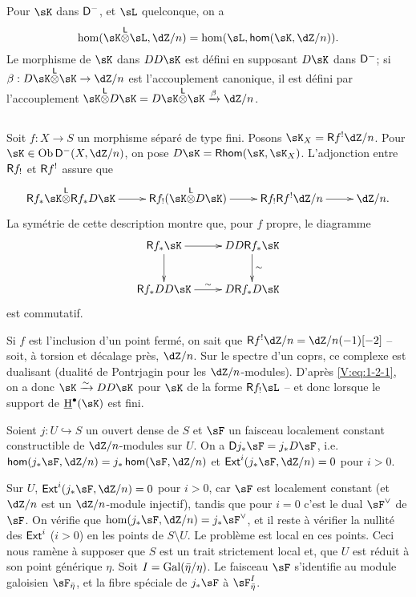 Pour $\sK$ dans $\mathsf{D}^-$, et $\sL$ quelconque, on a 
\[
  \hom(\sK\lotimes \sL,\dZ/n) = \hom(\sL,\Hom(\sK,\dZ/n)) \text{.}
\]
Le morphisme de $\sK$ dans $DD\sK$ est d\'efini en supposant $D\sK$ dans 
$\mathsf{D}^-$; si $\beta:D\sK\lotimes\sK\to \dZ/n$ est l'accouplement canonique, il 
est d\'efini par l'accouplement 
$\sK\lotimes D\sK=D\sK\lotimes \sK \xrightarrow\beta \dZ/n$. 





\subsection{}\label{V:1-2}

Soit $f:X\to S$ un morphisme s\'epar\'e de type fini. Posons 
$\sK_X=\R f^!\dZ/n$. Pour $\sK\in \ob\D^-(X,\dZ/n)$, on pose 
$D\sK = \rHom(\sK,\sK_X)$. L'adjonction entre $\mathsf{R} f_!$ et $\mathsf{R} f^!$ 
assure que 
\[\xymatrix{
  \R f_\ast \sK\lotimes \R f_\ast D\sK \ar[r] 
    & \R f_! (\sK\lotimes D\sK) \ar[r] 
    & \R f_! \R f^! \dZ/n \ar[r] 
    & \dZ/n \text{.}
}\]
La sym\'etrie de cette description montre que, pour $f$ propre, le diagramme 
\begin{equation}\label{V:eq:1-2-1}
\xymatrix{
  \R f_\ast \sK \ar[r] \ar[d] 
    & D D \R f_\ast \sK \ar[d]^-\sim \\
  \R f_\ast D D \sK \ar[r]^\sim 
    & D\R f_\ast D\sK
}
\end{equation}
est commutatif. 

Si $f$ est l'inclusion d'un point ferm\'e, on sait que 
$\R f^!\dZ/n=\dZ/n(-1)[-2]$ -- soit, \`a torsion et d\'ecalage pr\`es, $\dZ/n$. 
Sur le spectre d'un coprs, ce complexe est dualisant (dualit\'e de Pontrjagin 
pour les $\dZ/n$-modules). D'apr\`es \eqref{V:eq:1-2-1}, on a donc 
$\sK\iso D D\sK$ pour $\sK$ de la forme $\R f_!\sL$ -- et donc lorsque le 
support de $\underline\h^\bullet(\sK)$ est fini. 





\begin{theorem_}\label{V:1-3}
Soient $j:U\hookrightarrow S$ un ouvert dense de $S$ et $\sF$ un faisceau 
localement constant constructible de $\dZ/n$-modules sur $U$. On a 
$\D j_\ast \sF = j_\ast D \sF$, i.e. $\Hom(j_\ast \sF,\dZ/n) = j_\ast\Hom(\sF,\dZ/n)$ et $\Ext^i(j_\ast\sF,\dZ/n) = 0$ pour $i>0$.
\end{theorem_}

Sur $U$, $\Ext^i(j_\ast\sF,\dZ/n)=0$ pour $i>0$, car $\sF$ est localement 
constant (et $\dZ/n$ est un $\dZ/n$-module injectif), tandis que pour $i=0$ 
c'est le dual $\sF^\vee$ de $\sF$. On v\'erifie que 
$\hom(j_\ast\sF,\dZ/n)=j_\ast\sF^\vee$, et il reste \`a v\'erifier la nullit\'e 
des $\operatorname{\mathsf{Ext}}^i$ ($i>0$) en les points de $S\setminus U$. Le probl\`eme est local 
en ces points. Ceci nous ram\`ene \`a supposer que $S$ est un trait strictement 
local et, que $U$ est r\'eduit \`a son point g\'en\'erique $\eta$. Soit 
$I=\operatorname{Gal}(\bar\eta/\eta)$. Le faisceau $\sF$ s'identifie au module galoisien 
$\sF_{\bar\eta}$, et la fibre sp\'eciale de $j_\ast \sF$ \`a 
$\sF_{\bar\eta}^I$. 

